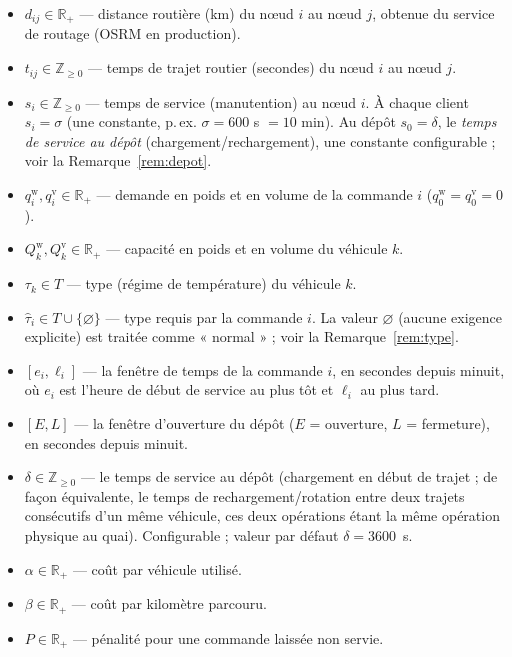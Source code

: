 \documentclass[12pt,a4paper]{report}
\newcommand{\R}{\mathbb{R}}
\newcommand{\Zp}{\mathbb{Z}_{\geq 0}}
\begin{document}
\begin{itemize}[leftmargin=2.2em]
  \item $d_{ij} \in \R_+$ --- distance routière (km) du nœud $i$ au
        nœud $j$, obtenue du service de routage (OSRM en production).
  \item $t_{ij} \in \Zp$ --- temps de trajet routier (secondes) du nœud $i$
        au nœud $j$.
  \item $s_i \in \Zp$ --- temps de service (manutention) au nœud $i$. À
        chaque client $s_i = \sigma$ (une constante, p.\,ex. $\sigma = 600$
        s $= 10$ min). Au dépôt $s_0 = \delta$, le \emph{temps de service au
        dépôt} (chargement/rechargement), une constante configurable ; voir
        la Remarque~\ref{rem:depot}.
  \item $q_i^{\mathrm w}, q_i^{\mathrm v} \in \R_+$ --- demande en
        poids et en volume de la commande $i$ ($q_0^{\mathrm w} =
        q_0^{\mathrm v} = 0$).
  \item $Q_k^{\mathrm w}, Q_k^{\mathrm v} \in \R_+$ --- capacité en
        poids et en volume du véhicule $k$.
  \item $\tau_k \in T$ --- type (régime de température) du véhicule $k$.
  \item $\hat{\tau}_i \in T \cup \{\varnothing\}$ --- type requis par la
        commande $i$. La valeur $\varnothing$ (aucune exigence explicite)
        est traitée comme « normal » ; voir la Remarque~\ref{rem:type}.
  \item $[e_i, \ell_i]$ --- la fenêtre de temps de la commande $i$, en
        secondes depuis minuit, où $e_i$ est l'heure de début de service au
        plus tôt et $\ell_i$ au plus tard.
  \item $[E, L]$ --- la fenêtre d'ouverture du dépôt ($E$ = ouverture, $L$ =
        fermeture), en secondes depuis minuit.
  \item $\delta \in \Zp$ --- le temps de service au dépôt (chargement en
        début de trajet ; de façon équivalente, le temps de
        rechargement/rotation entre deux trajets consécutifs d'un même
        véhicule, ces deux opérations étant la même opération physique au
        quai). Configurable ; valeur par défaut $\delta = 3600$~s.
  \item $\alpha \in \R_+$ --- coût par véhicule utilisé.
  \item $\beta \in \R_+$ --- coût par kilomètre parcouru.
  \item $P \in \R_+$ --- pénalité pour une commande laissée non servie.
\end{itemize}
\end{document}
